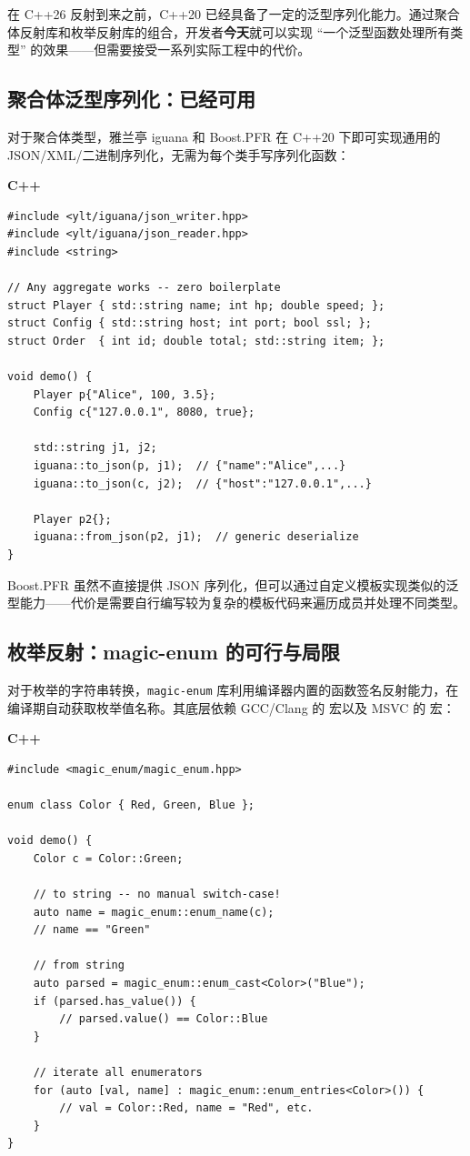 \documentclass[12pt,a4paper,fontset=fandol]{ctexbook}
\newcommand{\cpplabel}{%
  \noindent\begin{tcolorbox}[colback=algheadbg,coltext=white,
    sharp corners,boxrule=0pt,width=3.0em,height=1.4em,
    halign=center,valign=center,nobeforeafter,left=0pt,right=0pt,
    top=0pt,bottom=0pt]\small\bfseries C++\end{tcolorbox}}
\begin{document}
在 C++26 反射到来之前，C++20 已经具备了一定的泛型序列化能力。通过聚合体反射库和枚举反射库的组合，开发者\textbf{今天}就可以实现 ``一个泛型函数处理所有类型'' 的效果——但需要接受一系列实际工程中的代价。

\subsection{聚合体泛型序列化：已经可用}\label{sec:cpp20-aggregate}

对于聚合体类型，雅兰亭 iguana 和 Boost.PFR 在 C++20 下即可实现通用的 JSON/XML/二进制序列化，无需为每个类手写序列化函数：

\cpplabel
\begin{lstlisting}[caption={C++20: 雅兰亭 iguana 泛型 JSON 序列化（已可用）}]
#include <ylt/iguana/json_writer.hpp>
#include <ylt/iguana/json_reader.hpp>
#include <string>

// Any aggregate works -- zero boilerplate
struct Player { std::string name; int hp; double speed; };
struct Config { std::string host; int port; bool ssl; };
struct Order  { int id; double total; std::string item; };

void demo() {
    Player p{"Alice", 100, 3.5};
    Config c{"127.0.0.1", 8080, true};

    std::string j1, j2;
    iguana::to_json(p, j1);  // {"name":"Alice",...}
    iguana::to_json(c, j2);  // {"host":"127.0.0.1",...}

    Player p2{};
    iguana::from_json(p2, j1);  // generic deserialize
}
\end{lstlisting}

Boost.PFR 虽然不直接提供 JSON 序列化，但可以通过自定义模板实现类似的泛型能力——代价是需要自行编写较为复杂的模板代码来遍历成员并处理不同类型。

\subsection{枚举反射：magic-enum 的可行与局限}\label{sec:cpp20-enum}

对于枚举的字符串转换，\texttt{magic-enum} 库利用编译器内置的函数签名反射能力，在编译期自动获取枚举值名称。其底层依赖 GCC/Clang 的  宏以及 MSVC 的  宏：

\cpplabel
\begin{lstlisting}[caption={C++20: magic-enum 枚举反射}]
#include <magic_enum/magic_enum.hpp>

enum class Color { Red, Green, Blue };

void demo() {
    Color c = Color::Green;

    // to string -- no manual switch-case!
    auto name = magic_enum::enum_name(c);
    // name == "Green"

    // from string
    auto parsed = magic_enum::enum_cast<Color>("Blue");
    if (parsed.has_value()) {
        // parsed.value() == Color::Blue
    }

    // iterate all enumerators
    for (auto [val, name] : magic_enum::enum_entries<Color>()) {
        // val = Color::Red, name = "Red", etc.
    }
}
\end{lstlisting}
\end{document}
